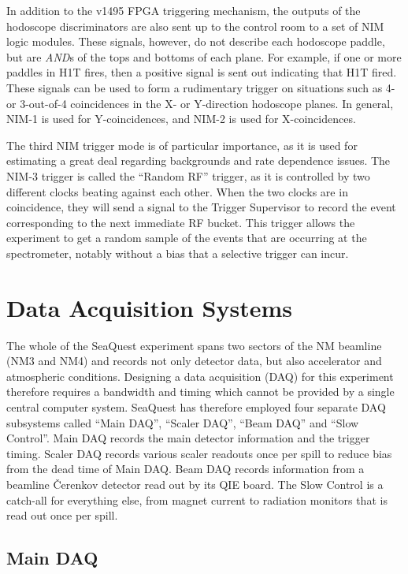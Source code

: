 In addition to the v1495 FPGA triggering mechanism, the outputs of the hodoscope discriminators are also sent up to the control room to a set of NIM logic modules. These signals, however, do not describe each hodoscope paddle, but are \emph{AND}s of the tops and bottoms of each plane. For example, if one or more paddles in H1T fires, then a positive signal is sent out indicating that H1T fired. These signals can be used to form a rudimentary trigger on situations such as 4- or 3-out-of-4 coincidences in the X- or Y-direction hodoscope planes. In general, NIM-1 is used for Y-coincidences, and NIM-2 is used for X-coincidences.

The third NIM trigger mode is of particular importance, as it is used for estimating a great deal regarding backgrounds and rate dependence issues. The NIM-3 trigger is called the ``Random RF'' trigger, as it is controlled by two different clocks beating against each other. When the two clocks are in coincidence, they will send a signal to the Trigger Supervisor to record the event corresponding to the next immediate RF bucket. This trigger allows the experiment to get a random sample of the events that are occurring at the spectrometer, notably without a bias that a selective trigger can incur.

\section{Data Acquisition Systems}

The whole of the SeaQuest experiment spans two sectors of the NM beamline (NM3 and NM4) and records not only detector data, but also accelerator and atmospheric conditions. Designing a data acquisition (DAQ) for this experiment therefore requires a bandwidth and timing which cannot be provided by a single central computer system. SeaQuest has therefore employed four separate DAQ subsystems called ``Main DAQ'', ``Scaler DAQ'', ``Beam DAQ'' and ``Slow Control''. Main DAQ records the main detector information and the trigger timing. Scaler DAQ records various scaler readouts once per spill to reduce bias from the dead time of Main DAQ. Beam DAQ records information from a beamline \v{C}erenkov detector read out by its QIE board. The Slow Control is a catch-all for everything else, from magnet current to radiation monitors that is read out once per spill.

\subsection{Main DAQ}

